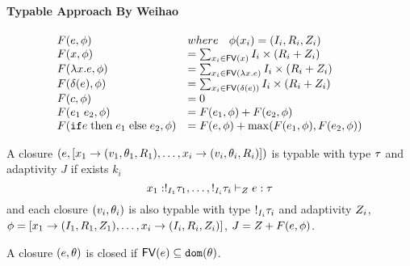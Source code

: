 \documentclass[a4paper,11pt]{article}
\theoremstyle{definition}
\begin{document}
\paragraph{Typable Approach By Weihao}
\[
\begin{array}{ll}
 F(\expr, \phi ) & where \eapp ~~ \phi(x_i) = (\idx_i, \adapt_i, \nnatA_i ) \\
   F(x,\phi) & = \sum_{x_i \in \fv{x}  } \idx_i \times (\adapt_i+ \nnatA_i)  \\
F(\lambda x. \expr ,  \phi  ) & =  \sum_{x_i \in \fv{\lambda x.\expr}  } \idx_i \times (\adapt_i+ \nnatA_i)   \\  %
F(\delta(\expr) , \phi ) & = \sum_{x_i \in \fv{\delta(\expr)} } \idx_i \times (\adapt_i+ \nnatA_i)  \\
F(c, \phi ) & = 0  \\
F(\expr_1 \eapp \expr_2, \phi ) & = F(\expr_1, \phi ) +
                                  F(\expr_2,\phi ) \\
F(\eif \expr \ethen \expr_1 \eelse \expr_2, \phi ) & = F(\expr, \phi) + \max(F(\expr_1, \phi),  F(\expr_2, \phi)   )  
\end{array} 
\]

\begin{defn}[Typable]
  \label{typable}
  A closure $( e, [ x_1 \to (v_1 ,  \theta_1 , R_1 ) , \ldots, x_i \to (v_i, \theta_i, R_i )] )$ is typable with type $\tau$ and adaptivity $J$ if exists $k_i$\\
  \[
     x_1 : !_{I_1} \tau_1, \ldots, !_{I_i} \tau_i 
     \vdash_{Z}  e : \tau  \]
   and each closure $(v_i, \theta_i)$  is also typable with type $!_{I_i} \tau_i$ and adaptivity $Z_i$, $ \phi = [x_1
     \to (I_1, R_1, Z_1), \ldots,  x_i \to (I_i, R_i,
     Z_i)  ] $,  $J = Z + F( e, \phi ) $.
 \end{defn}

 \begin{defn}[ClosedClosure]
  \label{closure}
   A closure $(e, \theta)$ is closed if $\mathsf{FV} (e) \subseteq \mathtt{dom}(\theta)$. 
 \end{defn}

 
\end{document}
